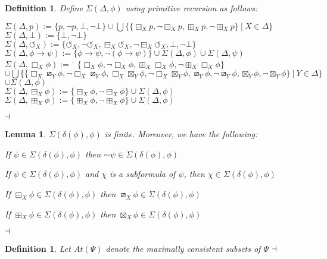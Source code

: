 \documentclass[11pt]{article}
\numberwithin{equation}{subsection}
\newtheorem{mydef}[theorem]{Definition}
\newtheorem{lemma}[theorem]{Lemma}
\newcommand{\Nec}{\Box}
\newcommand{\BB}{\boxminus}
\newcommand{\pBB}{\boxslash}
\newcommand{\BBI}{\boxplus}
\newcommand{\pBBI}{\boxtimes}
\newcommand{\PP}{\circlearrowleft}
\begin{document}
\begin{mydef}Define $\Sigma( \Delta,\phi)$ using primitive recursion as follows:
\begin{tabbing}$\Sigma(\Delta,p) :=  \{ p, \neg p, \bot, \neg\bot \} \cup \bigcup\{ \{ \BB_X p, \neg\BB_X p, \BBI_X p, \neg\BBI_X p\} \ |\ X \in \Delta \}$ \\
$\Sigma(\Delta,\bot) := \{ \bot, \neg\bot \}$ \\
$\Sigma(\Delta,\PP_X) := \{ \PP_X, \neg\PP_X, \BB_X \PP_X, \neg \BB_X \PP_X, \bot, \neg\bot \}$ \\
$\Sigma(\Delta,\phi\to\psi) := \{ \phi\to\psi,\neg(\phi\to\psi) \} \cup \Sigma(\Delta,\phi) \cup \Sigma(\Delta,\psi)$ \\
$\Sigma(\Delta,\Nec_X \phi) :=$ \= $\{ \Nec_X \phi, \neg \Nec_X \phi, \BBI_X \Nec_X \phi, \neg\BBI_X\Nec_X \phi \}$ \\
\> $\cup \bigcup\{\{\Nec_X \pBB_Y \phi, \neg\Nec_X \pBB_Y \phi, \Nec_X \pBBI_Y \phi, \neg\Nec_X \pBBI_Y \phi, \pBB_Y \phi, \neg \pBB_Y \phi, \pBBI_Y \phi, \neg\pBBI_Y \phi\}\ |\ Y \in \Delta \}$ \\
\> $ \cup \Sigma(\Delta,\phi)$\\
$\Sigma(\Delta,\BB_X \phi) := \{ \BB_X \phi, \neg\BB_X \phi\} \cup \Sigma(\Delta,\phi)$ \\
$\Sigma(\Delta,\BBI_X \phi) := \{ \BBI_X \phi, \neg\BBI_X \phi\} \cup \Sigma(\Delta,\phi)$
\end{tabbing}
$\hfill\dashv$\end{mydef}
\begin{lemma}\label{inclusions}
$\Sigma(\delta(\phi),\phi)$ is finite.  Moreover, we have the following:
\begin{bul}
	\item If $\psi \in \Sigma(\delta(\phi),\phi)$ then $\sim \psi \in \Sigma(\delta(\phi),\phi)$
	\item If $\psi \in \Sigma(\delta(\phi),\phi)$ and $\chi$ is a subformula of $\psi$, then $\chi \in \Sigma(\delta(\phi),\phi)$
	\item If $\BB_X \phi \in \Sigma(\delta(\phi),\phi)$ then $\pBB_X \phi \in \Sigma(\delta(\phi),\phi)$
	\item If $\BBI_X \phi \in \Sigma(\delta(\phi),\phi)$ then $\pBBI_X \phi \in \Sigma(\delta(\phi),\phi)$
\end{bul}
$\hfill\dashv$\end{lemma}
\begin{mydef}Let $At(\Psi)$ denote the maximally consistent subsets of $\Psi$
$\hfill\dashv$\end{mydef}
\end{document}
